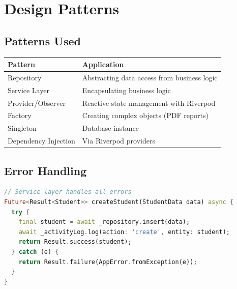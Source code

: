 \documentclass[12pt,a4paper]{report}
\begin{document}
\chapter{Design Patterns}

\section{Patterns Used}

\begin{longtable}{@{}p{4cm}p{9cm}@{}}
\toprule
\textbf{Pattern} & \textbf{Application} \\
\midrule
\endhead
Repository & Abstracting data access from business logic \\
Service Layer & Encapsulating business logic \\
Provider/Observer & Reactive state management with Riverpod \\
Factory & Creating complex objects (PDF reports) \\
Singleton & Database instance \\
Dependency Injection & Via Riverpod providers \\
\bottomrule
\end{longtable}

\section{Error Handling}

\begin{lstlisting}[language=Dart]
// Service layer handles all errors
Future<Result<Student>> createStudent(StudentData data) async {
  try {
    final student = await _repository.insert(data);
    await _activityLog.log(action: 'create', entity: student);
    return Result.success(student);
  } catch (e) {
    return Result.failure(AppError.fromException(e));
  }
}
\end{lstlisting}
\end{document}
